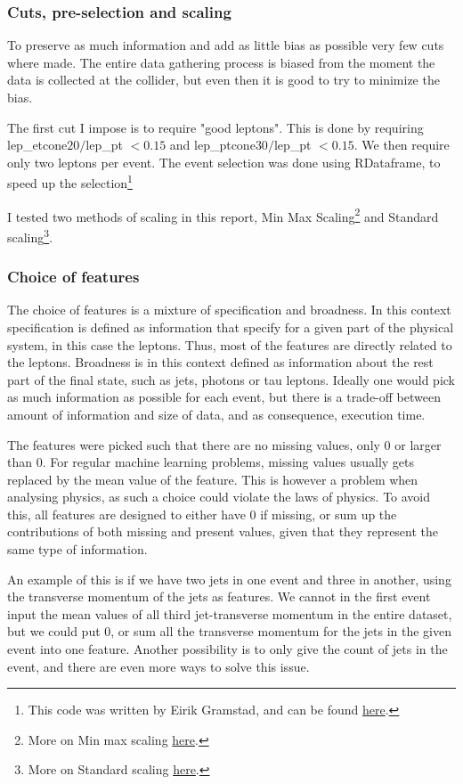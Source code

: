 \documentclass[ reprint, amsmath,amssymb, aps, nofootinbib]{revtex4-2}
\begin{document}
\subsubsection{Cuts, pre-selection and scaling}
To preserve as much information and add as little bias as possible very few cuts where made. The entire data gathering process is biased from the moment the data is collected at the collider, but even then it is good to try to minimize the bias. \par

The first cut I impose is to require "good leptons". This is done by requiring lep\_etcone$20/$lep\_pt $< 0.15$ and lep\_ptcone$30/$lep\_pt $< 0.15$. We then require only two leptons per event. The event selection was done using RDataframe\cite{rene_al._2019}, to speed up the selection\footnote{This code was written by Eirik Gramstad, and can be found \href{https://github.uio.no/zpath/software/blob/eirik-dev/Notebooks/ATLASOpenData/13TeV/RDataFrameToDF.ipynb}{here}.}\par 

I tested two methods of scaling in this report, Min Max Scaling\footnote{More on Min max scaling \href{https://scikit-learn.org/stable/modules/generated/sklearn.preprocessing.MinMaxScaler.html}{here}.} and Standard scaling\footnote{More on Standard scaling \href{https://scikit-learn.org/stable/modules/generated/sklearn.preprocessing.StandardScaler.html}{here}.}\cite{scikit-learn}.

\subsubsection{Choice of features}
The choice of features is a mixture of specification and broadness. In this context specification is defined as information that specify for a given part of the physical system, in this case the leptons. Thus, most of the features are directly related to the leptons. Broadness is in this context defined as information about the rest part of the final state, such as jets, photons or tau leptons. Ideally one would pick as much information as possible for each event, but there is a trade-off between amount of information and size of data, and as consequence, execution time. \par 
The features were picked such that there are no missing values, only 0 or larger than 0. For regular machine learning problems, missing values usually gets replaced by the mean value of the feature. This is however a problem when analysing physics, as such a choice could violate the laws of physics. To avoid this, all features are designed to either have 0 if missing, or sum up the contributions of both missing and present values, given that they represent the same type of information. \par 
An example of this is if we have two jets in one event and three in another, using the transverse momentum of the jets as features. We cannot in the first event input the mean values of all third jet-transverse momentum in the entire dataset, but we could put 0, or sum all the transverse momentum for the jets in the given event into one feature. Another possibility is to only give the count of jets in the event, and there are even more ways to solve this issue. 
\end{document}
